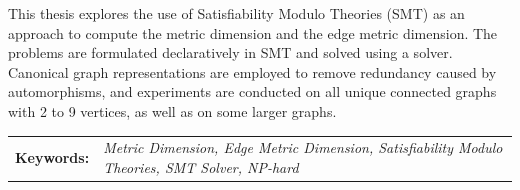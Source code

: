 This thesis explores the use of Satisfiability Modulo Theories (SMT) as an approach to compute the metric dimension and the edge metric dimension. The problems are formulated declaratively in SMT and solved using a solver. Canonical graph representations are employed to remove redundancy caused by automorphisms, and experiments are conducted on all unique connected graphs with 2 to 9 vertices, as well as on some larger graphs.

\vfill

\noindent
\begin{minipage}[t][0.375\textheight]{\textwidth}
	\begin{tabularx}{\linewidth}{@{}l@{\enspace}X}
		\textbf{Keywords:} & \textit{Metric Dimension, Edge Metric Dimension, Satisfiability Modulo Theories, SMT Solver, NP-hard}
	\end{tabularx}
\end{minipage}

%
